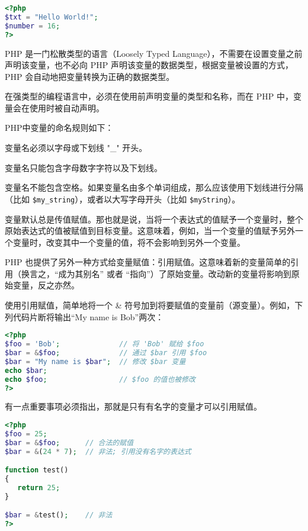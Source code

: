 \begin{lstlisting}[language=PHP]
<?php
$txt = "Hello World!";
$number = 16;
?>
\end{lstlisting}


PHP 是一门松散类型的语言（Loosely Typed Language），不需要在设置变量之前声明该变量，也不必向 PHP 声明该变量的数据类型，根据变量被设置的方式，PHP 会自动地把变量转换为正确的数据类型。

在强类型的编程语言中，必须在使用前声明变量的类型和名称，而在 PHP 中，变量会在使用时被自动声明。

PHP中变量的命名规则如下：

\begin{compactitem}
\item 变量名必须以字母或下划线 "\_" 开头。
\item 变量名只能包含字母数字字符以及下划线。
\item 变量名不能包含空格。如果变量名由多个单词组成，那么应该使用下划线进行分隔（比如 \texttt{\$my\_string}），或者以大写字母开头（比如 \texttt{\$myString}）。
\end{compactitem}

变量默认总是传值赋值。那也就是说，当将一个表达式的值赋予一个变量时，整个原始表达式的值被赋值到目标变量。这意味着，例如，当一个变量的值赋予另外一个变量时，改变其中一个变量的值，将不会影响到另外一个变量。


PHP 也提供了另外一种方式给变量赋值：引用赋值。这意味着新的变量简单的引用（换言之，“成为其别名” 或者 “指向”）了原始变量。改动新的变量将影响到原始变量，反之亦然。

使用引用赋值，简单地将一个 \& 符号加到将要赋值的变量前（源变量）。例如，下列代码片断将输出“My name is Bob”两次：

\begin{lstlisting}[language=PHP]
<?php
$foo = 'Bob';              // 将 'Bob' 赋给 $foo
$bar = &$foo;              // 通过 $bar 引用 $foo
$bar = "My name is $bar";  // 修改 $bar 变量
echo $bar;
echo $foo;                 // $foo 的值也被修改
?>
\end{lstlisting}

有一点重要事项必须指出，那就是只有有名字的变量才可以引用赋值。

\begin{lstlisting}[language=PHP]
<?php
$foo = 25;
$bar = &$foo;      // 合法的赋值
$bar = &(24 * 7);  // 非法; 引用没有名字的表达式

function test()
{
   return 25;
}

$bar = &test();    // 非法
?>
\end{lstlisting}

